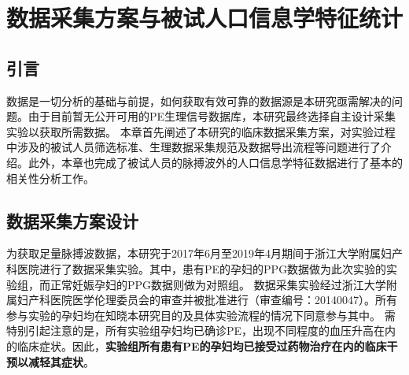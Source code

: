 \chapter{数据采集方案与被试人口信息学特征统计}
\section{引言}
数据是一切分析的基础与前提，如何获取有效可靠的数据源是本研究亟需解决的问题。由于目前暂无公开可用的PE生理信号数据库，本研究最终选择自主设计采集实验以获取所需数据。
本章首先阐述了本研究的临床数据采集方案，对实验过程中涉及的被试人员筛选标准、生理数据采集规范及数据导出流程等问题进行了介绍。此外，本章也完成了被试人员的脉搏波外的人口信息学特征数据进行了基本的相关性分析工作。
\section{数据采集方案设计}
为获取足量脉搏波数据，本研究于2017年6月至2019年4月期间于浙江大学附属妇产科医院进行了数据采集实验。其中，患有PE的孕妇的PPG数据做为此次实验的实验组，而正常妊娠孕妇的PPG数据则做为对照组。
数据采集实验经过浙江大学附属妇产科医院医学伦理委员会的审查并被批准进行（审查编号：20140047）。所有参与实验的孕妇均在知晓本研究目的及具体实验流程的情况下同意参与其中。
需特别引起注意的是，所有实验组孕妇均已确诊PE，出现不同程度的血压升高在内的临床症状。因此，\textbf{实验组所有患有PE的孕妇均已接受过药物治疗在内的临床干预以减轻其症状}。
